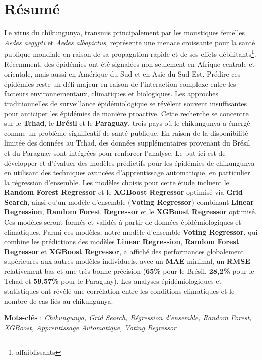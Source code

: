 \chapter*{Résumé}

\renewcommand{\abstractnamefont}{\normalfont\Large\bfseries}

\hskip7mm

\begin{spacing}{1.3}

\end{spacing}

Le virus du chikungunya, transmis principalement par les moustiques femelles \textit{Aedes aegypti} et \textit{Aedes albopictus}, représente une menace croissante pour la santé publique mondiale en raison de sa propagation rapide et de ses effets débilitants\footnote{affaiblissants}. Récemment, des épidémies ont été signalées non seulement en Afrique centrale et orientale, mais aussi en Amérique du Sud et en Asie du Sud-Est. Prédire ces épidémies reste un défi majeur en raison de l'interaction complexe entre les facteurs environnementaux, climatiques et biologiques. Les approches traditionnelles de surveillance épidémiologique se révèlent souvent insuffisantes pour anticiper les épidémies de manière proactive. Cette recherche se concentre sur le \textbf{Tchad}, le \textbf{Brésil} et le \textbf{Paraguay}, trois pays où le chikungunya a émergé comme un problème significatif de santé publique. En raison de la disponibilité limitée des données au Tchad, des données supplémentaires provenant du Brésil et du Paraguay sont intégrées pour renforcer l'analyse. Le but ici est de développer et d'évaluer des modèles prédictifs pour les épidémies de chikungunya en utilisant des techniques avancées d'apprentissage automatique, en particulier la régression d'ensemble. Les modèles choisis pour cette étude incluent le \textbf{Random Forest Regressor} et le \textbf{XGBoost Regressor} optimisé via \textbf{Grid Search}, ainsi qu'un modèle d'ensemble (\textbf{Voting Regressor}) combinant \textbf{Linear Regression}, \textbf{Random Forest Regressor} et le \textbf{XGBoost Regressor} optimisé. Ces modèles seront formés et validés à partir de données épidémiologiques et climatiques. Parmi ces modèles, notre modèle d'ensemble \textbf{Voting Regressor}, qui combine les prédictions des modèles \textbf{Linear Regression}, \textbf{Random Forest Regressor} et \textbf{XGBoost Regressor}, a affiché des performances globalement supérieures aux autres modèles individuels, avec un \textbf{MAE} minimal, un \textbf{RMSE} relativement bas et une très bonne précision (\textbf{65\%} pour le Brésil, \textbf{28,2\%} pour le Tchad et \textbf{59,57\%} pour le Paraguay). Les analyses épidémiologiques et statistiques ont révélé une corrélation entre les conditions climatiques et le nombre de cas liés au chikungunya.

\textbf{Mots-clés} : \textit{Chikungunya, Grid Search, Régression d'ensemble, Random Forest, XGBoost, Apprentissage Automatique, Voting Regressor}


